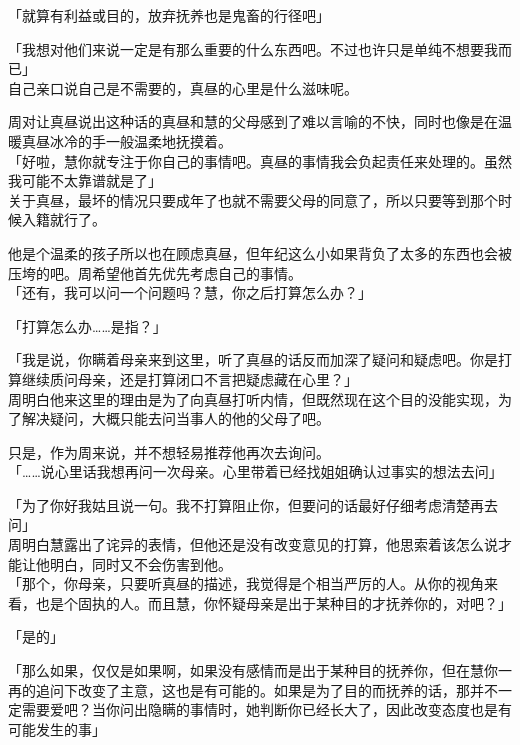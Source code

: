 「就算有利益或目的，放弃抚养也是鬼畜的行径吧」

「我想对他们来说一定是有那么重要的什么东西吧。不过也许只是单纯不想要我而已」\\

自己亲口说自己是不需要的，真昼的心里是什么滋味呢。

周对让真昼说出这种话的真昼和慧的父母感到了难以言喻的不快，同时也像是在温暖真昼冰冷的手一般温柔地抚摸着。\\

「好啦，慧你就专注于你自己的事情吧。真昼的事情我会负起责任来处理的。虽然我可能不太靠谱就是了」\\

关于真昼，最坏的情况只要成年了也就不需要父母的同意了，所以只要等到那个时候入籍就行了。

他是个温柔的孩子所以也在顾虑真昼，但年纪这么小如果背负了太多的东西也会被压垮的吧。周希望他首先优先考虑自己的事情。\\

「还有，我可以问一个问题吗？慧，你之后打算怎么办？」

「打算怎么办……是指？」

「我是说，你瞒着母亲来到这里，听了真昼的话反而加深了疑问和疑虑吧。你是打算继续质问母亲，还是打算闭口不言把疑虑藏在心里？」\\

周明白他来这里的理由是为了向真昼打听内情，但既然现在这个目的没能实现，为了解决疑问，大概只能去问当事人的他的父母了吧。

只是，作为周来说，并不想轻易推荐他再次去询问。\\

「……说心里话我想再问一次母亲。心里带着已经找姐姐确认过事实的想法去问」

「为了你好我姑且说一句。我不打算阻止你，但要问的话最好仔细考虑清楚再去问」\\

周明白慧露出了诧异的表情，但他还是没有改变意见的打算，他思索着该怎么说才能让他明白，同时又不会伤害到他。\\

「那个，你母亲，只要听真昼的描述，我觉得是个相当严厉的人。从你的视角来看，也是个固执的人。而且慧，你怀疑母亲是出于某种目的才抚养你的，对吧？」

「是的」

「那么如果，仅仅是如果啊，如果没有感情而是出于某种目的抚养你，但在慧你一再的追问下改变了主意，这也是有可能的。如果是为了目的而抚养的话，那并不一定需要爱吧？当你问出隐瞒的事情时，她判断你已经长大了，因此改变态度也是有可能发生的事」

